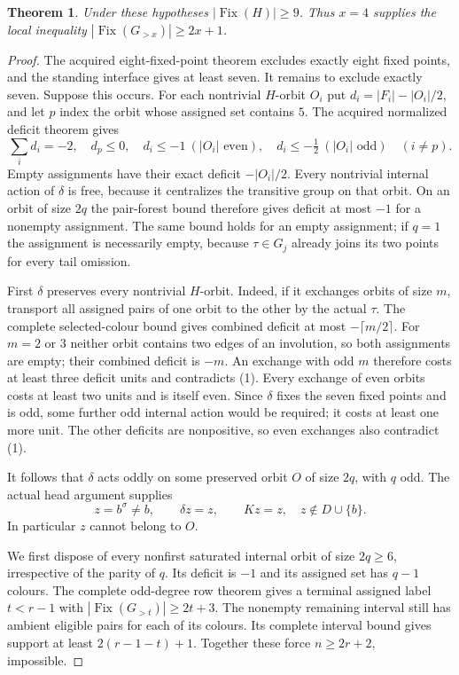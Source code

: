 \documentclass[11pt,a4paper]{article}
\newtheorem{theorem}{Theorem}
\begin{document}
\begin{theorem}
Under these hypotheses $|\operatorname{Fix}(H)|\ge9$.
Thus $x=4$ supplies the local inequality
$|\operatorname{Fix}(G_{>x})|\ge2x+1$.
\end{theorem}
\begin{proof}
The acquired eight-fixed-point theorem excludes exactly
eight fixed points, and the standing interface gives
at least seven. It remains to exclude exactly seven.
Suppose this occurs. For each nontrivial $H$-orbit
$O_i$ put $d_i=|F_i|-|O_i|/2$, and let $p$ index
the orbit whose assigned set contains $5$.
The acquired normalized deficit theorem gives
\[
 \sum_i d_i=-2,\quad d_p\le0,\quad
 d_i\le-1\ (|O_i|\text{ even}),\quad
 d_i\le-\tfrac12\ (|O_i|\text{ odd})\quad(i\ne p).
                                                        \tag{1}
\]
Empty assignments have their exact deficit $-|O_i|/2$.
Every nontrivial internal action of $\delta$ is free,
because it centralizes the transitive group on that
orbit. On an orbit of size $2q$ the pair-forest bound
therefore gives deficit at most $-1$ for a nonempty
assignment. The same bound holds for an empty assignment;
if $q=1$ the assignment is necessarily empty, because
$\tau\in G_j$ already joins its two points for every
tail omission.

First $\delta$ preserves every nontrivial $H$-orbit.
Indeed, if it exchanges orbits of size $m$, transport
all assigned pairs of one orbit to the other by the
actual $\tau$. The complete selected-colour bound gives
combined deficit at most $-\lceil m/2\rceil$.
For $m=2$ or $3$ neither orbit contains two edges of
an involution, so both assignments are empty; their
combined deficit is $-m$. An exchange with odd $m$
therefore costs at least three deficit units and
contradicts (1). Every exchange of even orbits costs
at least two units and is itself even. Since $\delta$
fixes the seven fixed points and is odd, some further
odd internal action would be required; it costs at
least one more unit. The other deficits are nonpositive,
so even exchanges also contradict (1).

It follows that $\delta$ acts oddly on some preserved
orbit $O$ of size $2q$, with $q$ odd. The actual head
argument supplies
\[
       z=b^\sigma\ne b,\qquad \delta z=z,\qquad Kz=z,
       \quad z\notin D\cup\{b\}.                     \tag{2}
\]
In particular $z$ cannot belong to $O$.

We first dispose of every nonfirst saturated internal
orbit of size $2q\ge6$, irrespective of the parity of
$q$. Its deficit is $-1$ and its assigned set has
$q-1$ colours. The complete odd-degree row theorem
gives a terminal assigned label $t<r-1$ with
$|\operatorname{Fix}(G_{>t})|\ge2t+3$.
The nonempty remaining interval still has ambient
eligible pairs for each of its colours. Its complete
interval bound gives support at least $2(r-1-t)+1$.
Together these force $n\ge2r+2$, impossible.


\end{proof}
\end{document}
